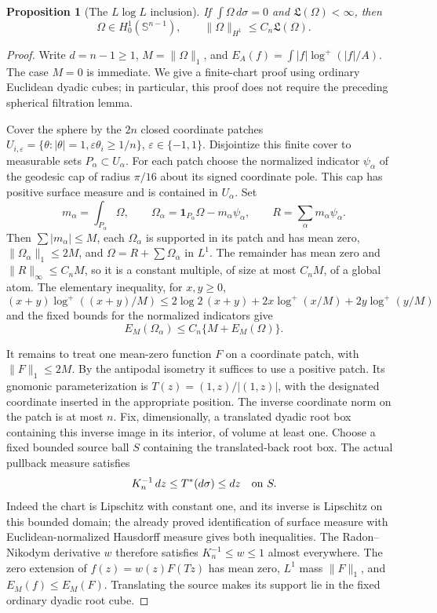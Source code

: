 \documentclass[11pt]{article}
\numberwithin{equation}{section}
\newtheorem{proposition}[theorem]{Proposition}
\theoremstyle{remark}
\theoremstyle{definition}
\newcommand{\LL}{\mathfrak L}
\begin{document}
\begin{proposition}[The $L\log L$ inclusion]\label{mod:atom:prop:LlogL-H1}
If $\int\Omega\,d\sigma=0$ and $\LL(\Omega)<\infty$, then
\[
 \Omega\in H^1_0(\mathbb S^{n-1}),\qquad
 \|\Omega\|_{H^1}\le C_n\LL(\Omega).
\]
\end{proposition}
\begin{proof}
Write $d=n-1\ge1$, $M=\|\Omega\|_1$, and
$E_A(f)=\int |f|\log^+(|f|/A)$.  The case $M=0$ is immediate.
We give a finite-chart proof using ordinary Euclidean dyadic cubes;
in particular, this proof does not require the preceding spherical
filtration lemma.

Cover the sphere by the $2n$ closed coordinate patches
$U_{i,\varepsilon}=\{\theta:|\theta|=1,
\varepsilon\theta_i\ge1/n\}$, $\varepsilon\in\{-1,1\}$.
Disjointize this finite cover to measurable sets $P_\alpha\subset U_\alpha$.
For each patch choose the normalized indicator $\psi_\alpha$ of the
geodesic cap of radius $\pi/16$ about its signed coordinate pole.
This cap has positive surface measure and is contained in $U_\alpha$.
Set
\[
 m_\alpha=\int_{P_\alpha}\Omega,\qquad
 \Omega_\alpha=\mathbf1_{P_\alpha}\Omega-m_\alpha\psi_\alpha,
 \qquad R=\sum_\alpha m_\alpha\psi_\alpha.
\]
Then $\sum|m_\alpha|\le M$, each $\Omega_\alpha$ is supported in its
patch and has mean zero, $\|\Omega_\alpha\|_1\le2M$, and
$\Omega=R+\sum\Omega_\alpha$ in $L^1$.
The remainder has mean zero and $\|R\|_\infty\le C_nM$, so it is a
constant multiple, of size at most $C_nM$, of a global atom.
The elementary inequality, for $x,y\ge0$,
\[
 (x+y)\log^+((x+y)/M)
 \le2\log2\,(x+y)+2x\log^+(x/M)+2y\log^+(y/M)
\]
and the fixed bounds for the normalized indicators give
\[
 E_M(\Omega_\alpha)\le C_n\{M+E_M(\Omega)\}.
\]

It remains to treat one mean-zero function $F$ on a coordinate patch,
with $\|F\|_1\le2M$.  By the antipodal isometry it suffices to use a
positive patch.  Its gnomonic parameterization is
$T(z)=(1,z)/|(1,z)|$, with the designated coordinate inserted in the
appropriate position.  The inverse coordinate norm on the patch is at
most $n$.  Fix, dimensionally, a translated dyadic root box containing
this inverse image in its interior, of volume at least one.  Choose a fixed bounded source ball $S$ containing the translated-back
root box.
The actual pullback measure satisfies
\[
 K_n^{-1}\,dz\le T^*(d\sigma)\le dz\quad\hbox{on }S.
\]
Indeed the chart is Lipschitz with constant one, and its inverse is
Lipschitz on this bounded domain; the already proved identification of
surface measure with Euclidean-normalized Hausdorff measure gives both
inequalities.  The Radon--Nikodym derivative $w$ therefore satisfies
$K_n^{-1}\le w\le1$ almost everywhere.  The zero extension of
$f(z)=w(z)F(Tz)$ has mean zero, $L^1$ mass $\|F\|_1$, and
$E_M(f)\le E_M(F)$.  Translating the source makes its support lie in the
fixed ordinary dyadic root cube.


\end{proof}
\end{document}
